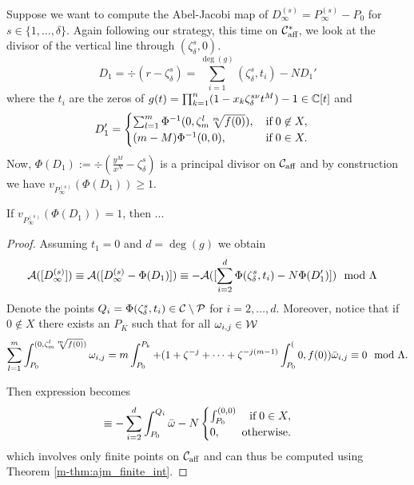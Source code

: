 \documentclass[main.tex]{subfiles}
\begin{document}
   
   Suppose we want to compute the Abel-Jacobi map of $D_{\infty}^{(s)} = P_{\infty}^{(s)} - P_0$ for $s \in \{1,\dots,\delta\}$.
   Again following our strategy,
   this time on $\mathcal{C}_{\text{aff}}^{*}$, we look at the divisor of the vertical line through $(\zeta_{\delta}^s,0)$.
   \begin{equation}
      D_1 = \div(r - \zeta_{\delta}^s) = \sum_{i = 1}^{\deg(g)} (\zeta_{\delta}^s,t_i) - N D_1'
   \end{equation}
      where the $t_i$ are the zeros of $g(t) = \prod_{k=1}^n (1-x_k\zeta_{\delta}^{s\nu}t^M) - 1 \in \mathbb{C}[t]$ and
    \begin{equation}
       D_1' = \begin{cases}
             \sum_{l=1}^m \Phi^{-1}(0,\zeta_m^l \sqrt[m]{f(0)}), \quad \text{if} \; 0 \not\in X,\\
             (m-M) \Phi^{-1}(0,0), \hfill \text{if} \; 0 \in X.
            \end{cases}
    \end{equation}
    Now, $\Phi(D_1) := \div \left( \frac{y^M}{x^N} - \zeta_{\delta}^s \right)$ is a principal divisor on $\mathcal{C}_{\text{aff}}$ and by
    construction we have $v_{P_{\infty}^{(s)}}(\Phi(D_1)) \ge 1$.
    
  \begin{lemma}
    If $v_{P_{\infty}^{(s)}}(\Phi(D_1)) = 1$, then ...
  \end{lemma}
  \begin{proof}
    Assuming $t_1 = 0$ and $d=\deg(g)$ we obtain
    \begin{align}
      \mathcal{A}( [D_{\infty}^{(s)}] )  & \equiv  \mathcal{A}([D_{\infty}^{(s)} - \Phi(D_1)])  
      \equiv  -\mathcal{A}( [\sum_{i = 2}^{d} \Phi(\zeta_{\delta}^s,t_i) - N \Phi(D_1') ] )
       \mod \Lambda
    \end{align}
    Denote the points $Q_i = \Phi(\zeta_{\delta}^s,t_i) \in \mathcal{C} \setminus \mathcal{P}$ for $i = 2,\dots,d$. Moreover, notice that if $0 \not\in X$
    there exists an $P_K$ such that for all $\omega_{i,j} \in \mathcal{W}$
    \begin{align}
     \sum_{l=1}^m \int_{P_0}^{(0,\zeta_m^l \sqrt[m]{f(0)})} \omega_{i,j} = m \int_{P_0}^{P_k} + (1 + \zeta^{-j} + \dots + \zeta^{-j(m-1)} \int_{P_0}^(0,f(0)) \bar{\omega}_{i,j}
     \equiv 0 \mod \Lambda.
    \end{align}

    Then expression becomes
    \begin{align}
    & \equiv -\sum_{i = 2}^{d} \int_{P_0}^{Q_i} \bar\w - N \begin{cases}
                                            \int_{P_0}^{(0,0)} \quad \text{if} \; 0 \in X,\\
                                            0, \hfill \text{otherwise}.
                                          \end{cases}
    \end{align}
    which involves only finite points on $\mathcal{C}_{\text{aff}}$ and can thus be computed using Theorem \ref{m-thm:ajm_finite_int}.
     \end{proof}
\end{document}

